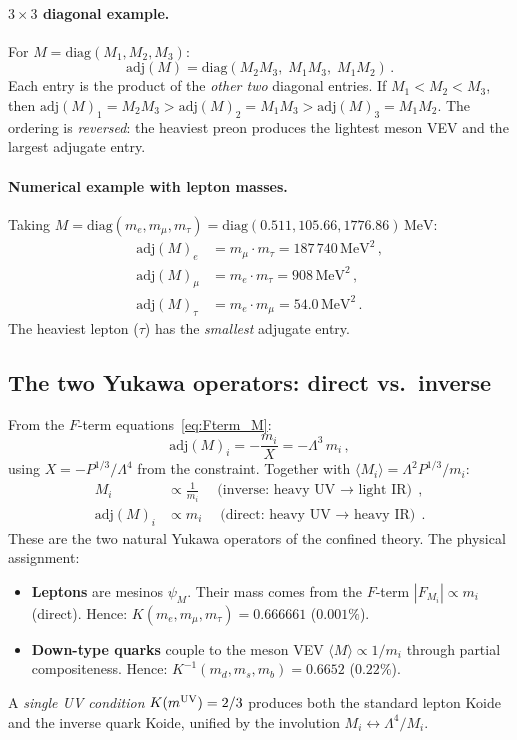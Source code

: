\documentclass[12pt,a4paper]{article}
\newcommand{\adj}{\mathrm{adj}}
\newcommand{\diag}{\mathrm{diag}}
\newcommand{\MeV}{\,\mathrm{MeV}}
\begin{document}
\paragraph{$3 \times 3$ diagonal example.}
For $M = \diag(M_1, M_2, M_3)$:
\begin{equation}
  \adj(M) = \diag(M_2 M_3,\; M_1 M_3,\; M_1 M_2)\,.
  \label{eq:adj_3x3}
\end{equation}
Each entry is the product of the \emph{other two} diagonal entries.
If $M_1 < M_2 < M_3$, then
$\adj(M)_1 = M_2 M_3 > \adj(M)_2 = M_1 M_3 > \adj(M)_3 =
M_1 M_2$.
The ordering is \emph{reversed}: the heaviest preon produces the
lightest meson VEV and the largest adjugate entry.

\paragraph{Numerical example with lepton masses.}
Taking $M = \diag(m_e, m_\mu, m_\tau) =
\diag(0.511, 105.66, 1776.86)\MeV$:
\begin{align}
  \adj(M)_e &= m_\mu \cdot m_\tau = 187\,740\MeV^2\,,
  \nonumber\\
  \adj(M)_\mu &= m_e \cdot m_\tau = 908\MeV^2\,,
  \nonumber\\
  \adj(M)_\tau &= m_e \cdot m_\mu = 54.0\MeV^2\,.
\end{align}
The heaviest lepton ($\tau$) has the \emph{smallest} adjugate
entry.


\subsection{The two Yukawa operators: direct vs.\ inverse}

From the $F$-term equations~\eqref{eq:Fterm_M}:
\begin{equation}
  \adj(M)_i = -\frac{m_i}{X} = -\Lambda^3\,m_i\,,
  \label{eq:adjM_from_Fterm}
\end{equation}
using $X = -P^{1/3}/\Lambda^4$ from the constraint.
Together with $\langle M_i \rangle = \Lambda^2 P^{1/3}/m_i$:
\begin{align}
  M_i &\propto \frac{1}{m_i}
    \quad\text{(inverse: heavy UV $\to$ light IR)}\,,
    \label{eq:M_inverse}\\
  \adj(M)_i &\propto m_i
    \quad\text{(direct: heavy UV $\to$ heavy IR)}\,.
    \label{eq:adjM_direct}
\end{align}
These are the two natural Yukawa operators of the confined theory.
The physical assignment:
\begin{itemize}
  \item \textbf{Leptons} are mesinos $\psi_M$.
    Their mass comes from the $F$-term
    $|F_{M_i}| \propto m_i$ (direct).
    Hence: $K(m_e, m_\mu, m_\tau) = 0.666661$ ($0.001\%$).
  \item \textbf{Down-type quarks} couple to the meson VEV
    $\langle M \rangle \propto 1/m_i$ through partial
    compositeness.
    Hence: $K^{-1}(m_d, m_s, m_b) = 0.6652$ ($0.22\%$).
\end{itemize}
A \emph{single UV condition} $K(m^{\rm UV}) = 2/3$ produces
both the standard lepton Koide and the inverse quark Koide,
unified by the involution $M_i \leftrightarrow \Lambda^4/M_i$.
\end{document}
